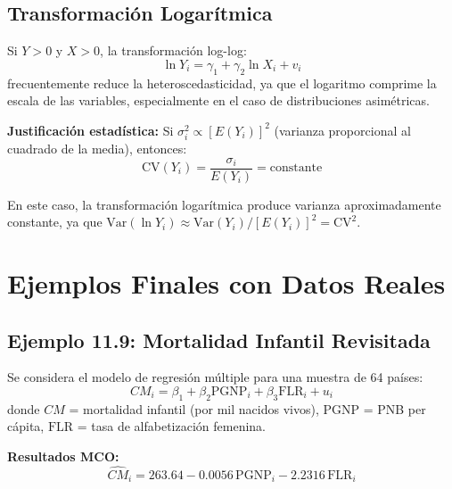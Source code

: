 \documentclass[12pt,a4paper]{report}
\theoremstyle{definition}
\theoremstyle{remark}
\newcommand{\Var}{\mathrm{Var}}
\begin{document}
\subsection{Transformación Logarítmica}

Si $Y > 0$ y $X > 0$, la transformación log-log:
\begin{equation}
  \ln Y_i = \gamma_1 + \gamma_2 \ln X_i + v_i
  \label{eq:log_log}
\end{equation}
frecuentemente reduce la heteroscedasticidad, ya que el logaritmo comprime la escala de las variables, especialmente en el caso de distribuciones asimétricas.

\textbf{Justificación estadística:} Si $\sigma_i^2 \propto [E(Y_i)]^2$ (varianza proporcional al cuadrado de la media), entonces:
\begin{equation}
  \text{CV}(Y_i) = \frac{\sigma_i}{E(Y_i)} = \text{constante}
  \label{eq:cv_const}
\end{equation}

En este caso, la transformación logarítmica produce varianza aproximadamente constante, ya que $\Var(\ln Y_i) \approx \Var(Y_i)/[E(Y_i)]^2 = \text{CV}^2$.

\section{Ejemplos Finales con Datos Reales}

\subsection{Ejemplo 11.9: Mortalidad Infantil Revisitada}

Se considera el modelo de regresión múltiple para una muestra de 64 países:
\begin{equation}
  CM_i = \beta_1 + \beta_2 \text{PGNP}_i + \beta_3 \text{FLR}_i + u_i
  \label{eq:mortalidad}
\end{equation}
donde $CM$ = mortalidad infantil (por mil nacidos vivos), $\text{PGNP}$ = PNB per cápita, $\text{FLR}$ = tasa de alfabetización femenina.

\textbf{Resultados MCO:}
\begin{equation}
  \widehat{CM}_i = 263.64 - 0.0056\,\text{PGNP}_i - 2.2316\,\text{FLR}_i
  \label{eq:mortalidad_ols}
\end{equation}
\end{document}
